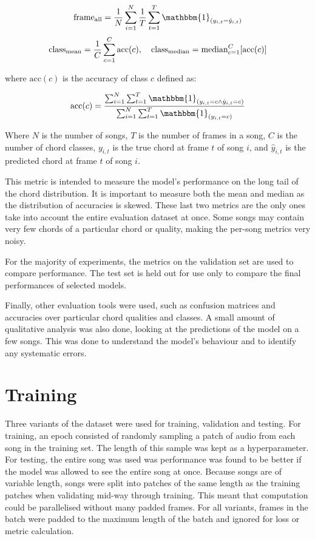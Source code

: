 \[\text{frame}\textsubscript{all} = \frac{1}{N} \sum_{i=1}^{N} \frac{1}{T} \sum_{t=1}^{T} \mathbbm{1}_{(y_{i,t} = \hat{y}_{i,t})}\]
\[
\text{class}\textsubscript{mean} = \frac{1}{C} \sum_{c=1}^{C} \text{acc}(c), \quad
\text{class}\textsubscript{median} = \text{median}_{c=1}^{C} [\text{acc}(c)]
\]


where $\text{acc}(c)$ is the accuracy of class $c$ defined as:

\[\text{acc}(c) = \frac{\sum_{i=1}^{N} \sum_{t=1}^{T} \mathbbm{1}_{(y_{i,t} = c \land \hat{y}_{i,t} = c)}}{\sum_{i=1}^{N} \sum_{t=1}^{T} \mathbbm{1}_{(y_{i,t} = c)}}\]


Where $N$ is the number of songs, $T$ is the number of frames in a song, $C$ is the number of chord classes, $y_{i,t}$ is the true chord at frame $t$ of song $i$, and $\hat{y}_{i,t}$ is the predicted chord at frame $t$ of song $i$.

This metric is intended to measure the model's performance on the long tail of the chord distribution. It is important to measure both the mean and median as the distribution of accuracies is skewed. These last two metrics are the only ones take into account the entire evaluation dataset at once. Some songs may contain very few chords of a particular chord or quality, making the per-song metrics very noisy.

For the majority of experiments, the metrics on the validation set are used to compare performance. The test set is held out for use only to compare the final performances of selected models.

Finally, other evaluation tools were used, such as confusion matrices and accuracies over particular chord qualities and classes. A small amount of qualitative analysis was also done, looking at the predictions of the model on a few songs. This was done to understand the model's behaviour and to identify any systematic errors.

\section{Training}

Three variants of the dataset were used for training, validation and testing. For training, an epoch consisted of randomly sampling a patch of audio from each song in the training set. The length of this sample was kept as a hyperparameter. For testing, the entire song was used was performance was found to be better if the model was allowed to see the entire song at once. Because songs are of variable length, songs were split into patches of the same length as the training patches when validating mid-way through training. This meant that computation could be parallelised without many padded frames. For all variants, frames in the batch were padded to the maximum length of the batch and ignored for loss or metric calculation.

